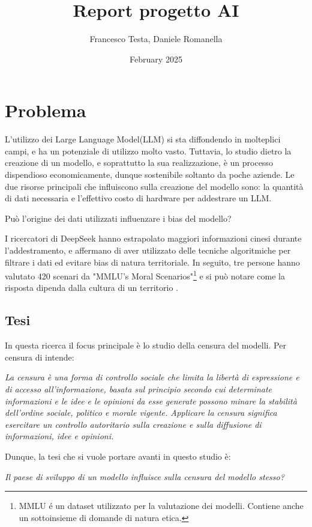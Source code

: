 \documentclass{article}
\title{Report progetto AI}
\author{Francesco Testa, Daniele Romanella}
\date{February 2025}
\begin{document}
\maketitle
\tableofcontents
\newpage

\section{Problema}

L'utilizzo dei Large Language Model(LLM) si sta diffondendo in molteplici campi, e ha un potenziale di utilizzo molto vasto. 
Tuttavia, lo studio dietro la creazione di un modello, e soprattutto la sua realizzazione, è un processo dispendioso economicamente, dunque sostenibile soltanto da poche aziende. 
Le due risorse principali che influiscono sulla creazione del modello sono: la quantità di dati necessaria e l'effettivo costo di hardware per addestrare un LLM.

Può l'origine dei dati utilizzati influenzare i bias del modello?

I ricercatori di DeepSeek hanno estrapolato maggiori informazioni cinesi durante l'addestramento, e affermano di aver utilizzato delle tecniche algoritmiche per filtrare i dati ed evitare bias di natura territoriale. 
In seguito, tre persone hanno valutato 420 scenari da "MMLU’s Moral Scenarios"\footnote{MMLU \'{e} un dataset utilizzato per la valutazione dei modelli. Contiene anche un sottoinsieme di domande di natura etica.} e si può notare come la risposta dipenda dalla cultura di un territorio \cite{deepseek_paper}. 

\subsection{Tesi}
In questa ricerca il focus principale è lo studio della censura del modelli.
Per censura di intende:

\begin{center}
\textit{La censura è una forma di controllo sociale che limita la libertà di espressione e di accesso all'informazione, basata sul principio secondo cui determinate informazioni e le idee e le opinioni da esse generate possono minare la stabilità dell'ordine sociale, politico e morale vigente. Applicare la censura significa esercitare un controllo autoritario sulla creazione e sulla diffusione di informazioni, idee e opinioni.}\cite{censura_definizione}
\end{center} 

Dunque, la tesi che si vuole portare avanti in questo studio è:
\begin{center}
    \textit{Il paese di sviluppo di un modello influisce sulla censura del modello stesso?}
\end{center}
\end{document}

